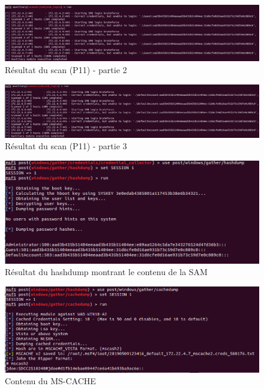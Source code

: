\documentclass[12pt]{report} %
\begin{document}
\begin{figure}[!h]
	\includegraphics[width=17cm]{P11-b.PNG}
	\caption*{Résultat du scan (P11) - partie 2}
\end{figure}

\begin{figure}[!h]
	\includegraphics[width=17cm]{P11-c.PNG}
	\caption*{Résultat du scan (P11) - partie 3}
\end{figure}

\begin{figure}[!h]
	\includegraphics[width=17cm]{hashdump_SAM_3_3.PNG}
	\caption*{Résultat du hashdump montrant le contenu de la SAM}
\end{figure}

\begin{figure}[!h]
	\includegraphics[width=17cm]{mscash_3_3.PNG}
	\caption*{Contenu du MS-CACHE}
\end{figure}
\end{document}
